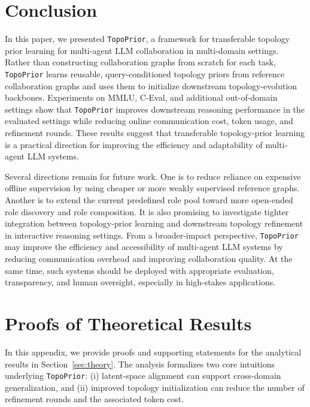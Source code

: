 \documentclass[lettersize,journal]{IEEEtran}
\theoremstyle{plain}
\begin{document}
\section{Conclusion}
\label{sec_conclusion}

In this paper, we presented \texttt{TopoPrior}, a framework for transferable topology prior learning for multi-agent LLM collaboration in multi-domain settings. Rather than constructing collaboration graphs from scratch for each task, \texttt{TopoPrior} learns reusable, query-conditioned topology priors from reference collaboration graphs and uses them to initialize downstream topology-evolution backbones. Experiments on MMLU, C-Eval, and additional out-of-domain settings show that \texttt{TopoPrior} improves downstream reasoning performance in the evaluated settings while reducing online communication cost, token usage, and refinement rounds. These results suggest that transferable topology-prior learning is a practical direction for improving the efficiency and adaptability of multi-agent LLM systems.

Several directions remain for future work. One is to reduce reliance on expensive offline supervision by using cheaper or more weakly supervised reference graphs. Another is to extend the current predefined role pool toward more open-ended role discovery and role composition. It is also promising to investigate tighter integration between topology-prior learning and downstream topology refinement in interactive reasoning settings. From a broader-impact perspective, \texttt{TopoPrior} may improve the efficiency and accessibility of multi-agent LLM systems by reducing communication overhead and improving collaboration quality. At the same time, such systems should be deployed with appropriate evaluation, transparency, and human oversight, especially in high-stakes applications.





\newpage
\appendices
\section{Proofs of Theoretical Results}
\label{proof_theory}

In this appendix, we provide proofs and supporting statements for the analytical results in Section~\ref{sec:theory}. The analysis formalizes two core intuitions underlying \texttt{TopoPrior}: (i) latent-space alignment can support cross-domain generalization, and (ii) improved topology initialization can reduce the number of refinement rounds and the associated token cost.
\end{document}
